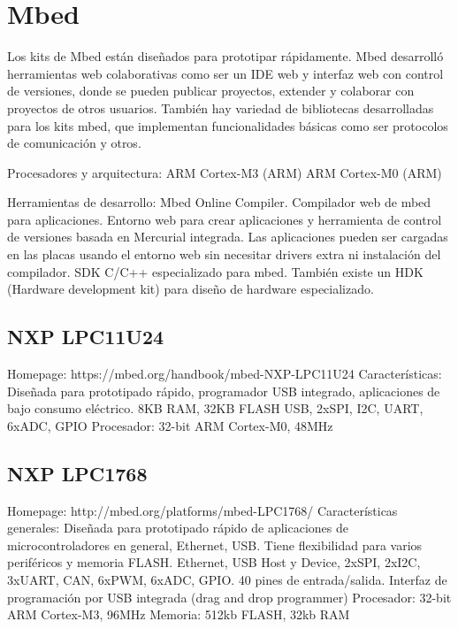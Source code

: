 

\section{Mbed}

Los kits de Mbed están diseñados para prototipar rápidamente. Mbed desarrolló herramientas web colaborativas como ser un IDE web y interfaz web con control de versiones, donde se pueden publicar proyectos, extender y colaborar con proyectos de otros usuarios.
También hay variedad de bibliotecas desarrolladas para los kits mbed, que implementan funcionalidades básicas como ser protocolos de comunicación y otros.

Procesadores y arquitectura:
  ARM Cortex-M3 (ARM)
  ARM Cortex-M0 (ARM)

Herramientas de desarrollo:
  Mbed Online Compiler. Compilador web de mbed para aplicaciones. 
  Entorno web para crear aplicaciones y herramienta de control de versiones basada en Mercurial integrada. Las aplicaciones pueden ser cargadas en las placas usando el entorno web sin necesitar drivers extra ni instalación del compilador.
  SDK C/C++ especializado para mbed.
  También existe un HDK (Hardware development kit) para diseño de hardware especializado.

\subsection{NXP LPC11U24}

Homepage:
https://mbed.org/handbook/mbed-NXP-LPC11U24
Características:
Diseñada para prototipado rápido, programador USB integrado, aplicaciones de bajo consumo eléctrico.
8KB RAM, 32KB FLASH
USB, 2xSPI, I2C, UART, 6xADC, GPIO 
Procesador:
32-bit ARM Cortex-M0, 48MHz

\subsection{NXP LPC1768}
Homepage:
http://mbed.org/platforms/mbed-LPC1768/
Características generales:
Diseñada para prototipado rápido de aplicaciones de microcontroladores en general, Ethernet, USB.
Tiene flexibilidad para varios periféricos y memoria FLASH.
Ethernet, USB Host y Device, 2xSPI, 2xI2C, 3xUART, CAN, 6xPWM, 6xADC, GPIO.
40 pines de entrada/salida.
Interfaz de programación por USB integrada (drag and drop programmer)
Procesador:
32-bit ARM Cortex-M3, 96MHz
Memoria:
512kb FLASH, 32kb RAM

